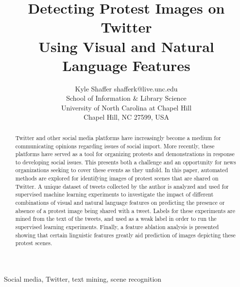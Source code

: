 \documentclass[twoside,11pt]{article}
\begin{document}
\title{Detecting Protest Images on Twitter \\
Using Visual and Natural Language Features}

\author{\name Kyle Shaffer \email shafferk@live.unc.edu \\
       \addr School of Information \& Library Science\\
       University of North Carolina at Chapel Hill\\
       Chapel Hill, NC 27599, USA}

\editor{\textcolor{white}{Leslie Pack Kaelbling}}

\maketitle

\begin{abstract}%
Twitter and other social media platforms have increasingly become a medium for communicating opinions regarding issues of social import. More recently, these platforms have served as a tool for organizing protests and demonstrations in response to developing social issues. This presents both a challenge and an opportunity for news organizations seeking to cover these events as they unfold. In this paper, automated methods are explored for identifying images of protest scenes that are shared on Twitter. A unique dataset of tweets collected by the author is analyzed and used for supervised machine learning experiments to investigate the impact of different combinations of visual and natural language features on predicting the presence or absence of a protest image being shared with a tweet. Labels for these experiments are mined from the text of the tweets, and used as a weak label in order to run the supervised learning experiments. Finally, a feature ablation analysis is presented showing that certain linguistic features greatly aid prediction of images depicting these protest scenes.
\end{abstract}
\begin{keywords}
  Social media, Twitter, text mining, scene recognition
\end{keywords}
\end{document}
